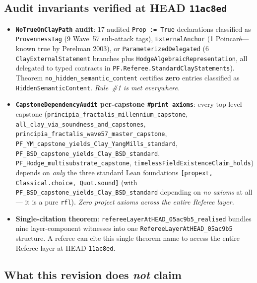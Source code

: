 \subsection*{Audit invariants verified at HEAD \texttt{11ac8ed}}

\begin{itemize}
\item \textbf{\texttt{NoTrueOnClayPath} audit}: 17 audited
\texttt{Prop := True} declarations classified as \texttt{ProvennessTag}
(9 Wave~57 sub-attack tags), \texttt{ExternalAnchor}
(1 Poincar\'{e}---known true by Perelman 2003), or
\texttt{ParameterizedDelegated} (6 \texttt{ClayExternalStatement}
branches plus \texttt{HodgeAlgebraicRepresentation}, all delegated to
typed contracts in \texttt{PF.Referee.StandardClayStatements}).
Theorem \texttt{no\_hidden\_semantic\_content} certifies
\textbf{zero} entries classified as
\texttt{HiddenSemanticContent}. \emph{Rule~\#1 is met everywhere.}
\item \textbf{\texttt{CapstoneDependencyAudit} per-capstone
\texttt{\#print axioms}}: every top-level capstone
(\texttt{principia\_fractalis\_millennium\_capstone},
\texttt{all\_clay\_via\_soundness\_and\_capstones},
\texttt{principia\_fractalis\_wave57\_master\_capstone},
\texttt{PF\_YM\_capstone\_yields\_Clay\_YangMills\_standard},
\texttt{PF\_BSD\_capstone\_yields\_Clay\_BSD\_standard},
\texttt{PF\_Hodge\_multisubstrate\_capstone},
\texttt{timelessFieldExistenceClaim\_holds}) depends on
\emph{only} the three standard Lean foundations
\texttt{[propext, Classical.choice, Quot.sound]} (with
\texttt{PF\_BSD\_capstone\_yields\_Clay\_BSD\_standard} depending
on \emph{no axioms} at all --- it is a pure \texttt{rfl}). \emph{Zero
project axioms across the entire Referee layer.}
\item \textbf{Single-citation theorem}:
\texttt{refereeLayerAtHEAD\_05ac9b5\_realised} bundles
nine layer-component witnesses into one
\texttt{RefereeLayerAtHEAD\_05ac9b5} structure. A referee can cite
this single theorem name to access the entire Referee layer at
HEAD \texttt{11ac8ed}.
\end{itemize}

\subsection*{What this revision does \emph{not} claim}

